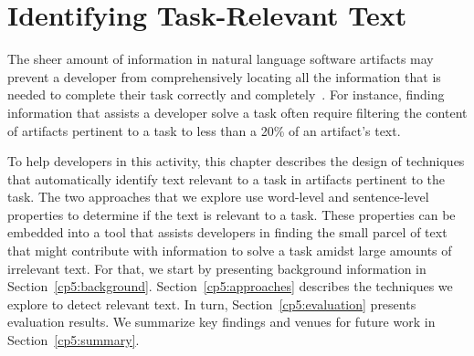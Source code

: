 \setcounter{chapter}{4}
\setcounter{rq}{1}


\chapter{Identifying Task-Relevant Text}
\label{ch:identifying}



\vspace{1mm}



The sheer amount of information in natural language software artifacts may prevent a developer from comprehensively locating all the information that is needed to complete their task correctly and completely~\cite{Murphy2005}.
For instance,
finding information that assists a developer solve a 
task often require filtering
the content of artifacts pertinent to a task 
to less than a 20\% of an artifact's text.


To help developers in this activity, 
this chapter describes the design of techniques
that automatically identify text relevant
to a task in artifacts
pertinent to the task.
The two approaches that we explore use 
word-level and sentence-level
properties
to determine if the text is relevant to a task.
These properties can be embedded into a tool that 
assists developers
in finding the small parcel of text that might contribute with 
information to solve a task amidst large amounts of irrelevant text.
For that, we start by presenting background information in Section~\ref{cp5:background}.
Section~\ref{cp5:approaches} describes the techniques
we explore to detect relevant text. In turn, 
Section~\ref{cp5:evaluation} presents evaluation results.
We summarize key findings 
and venues for future work in Section~\ref{cp5:summary}.


\clearpage

















